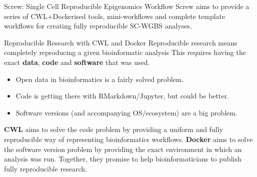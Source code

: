 \documentclass{beamer}
\begin{document}
\begin{frame}
\begin{columns}[t]
\begin{column}{.32\textwidth}
\begin{block}{Screw: Single Cell Reproducible Epigenomics Workflow}
Screw aims to provide a series of CWL+Dockerised tools, mini-workflows and complete template workflows for creating fully reproducible SC-WGBS analyses.

\end{block}


\begin{block}{Reproducible Research with CWL and Docker}
Reproducible research means completely reproducing a given bioinformatic analysis
This requires having the exact \textbf{data}, \textbf{code} and \textbf{software} that was used.

\begin{itemize}
\item Open data in bioinformatics is a fairly solved problem.
\item Code is getting there with RMarkdown/Jupyter, but could be better.
\item Software versions (and accompanying OS/ecosystem) are a big problem.
\end{itemize}
\textbf{CWL} aims to solve the code problem by providing a uniform and fully reproducible way of representing bioinformatics workflows. \textbf{Docker} aims to solve the software version problem by providing the exact environment in which an analysis was run. Together, they promise to help bioinformaticians to publish fully reproducible research.


\end{block}
\end{column}
\end{columns}
\end{frame}
\end{document}
